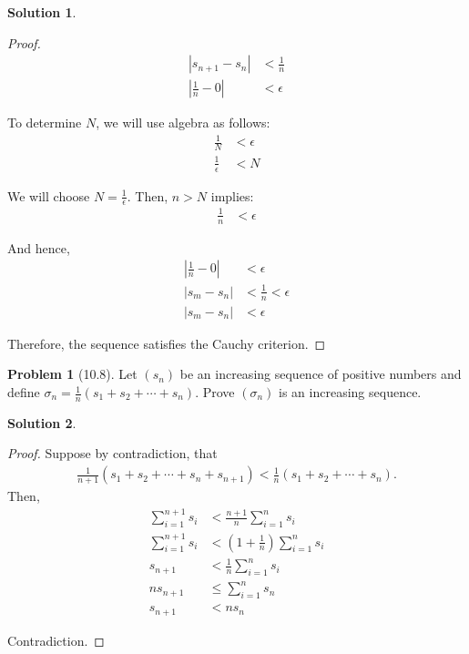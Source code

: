 \documentclass[12pt]{article}
\theoremstyle{definition} %
\newtheorem{solution}{Solution}
\newtheorem{problem}{Problem}
\theoremstyle{plain} %
\begin{document}
\begin{solution}
\begin{enumerate}
\begin{proof}
            \begin{align}
                |s_{n+1} - s_n| &< \frac{1}{n} \tag{40} \\
                \left| \frac{1}{n} - 0 \right| &< \epsilon \tag{41}
            \end{align}
        
            To determine $N$, we will use algebra as follows:
            \begin{align}
                \frac{1}{N} &< \epsilon \tag{42} \\
                \frac{1}{\epsilon} &< N \tag{43}
            \end{align}
        
            We will choose $N = \frac{1}{\epsilon}$. Then, $n > N$ implies:
            \begin{align}
                \frac{1}{n} &< \epsilon \tag{44}
            \end{align}
        
            And hence,
            \begin{align}
                \left| \frac{1}{n} - 0 \right| &< \epsilon \tag{45} \\
                |s_m - s_n| &< \frac{1}{n} < \epsilon \tag{46} \\
                |s_m - s_n| &< \epsilon \tag{47}
            \end{align}
        
            Therefore, the sequence satisfies the Cauchy criterion. 
        \end{proof}
    \end{enumerate}
\end{solution}

\begin{problem}[10.8]
    Let $(s_n)$ be an increasing sequence of positive numbers and define $\sigma_n = \frac{1}{n} (s_1 + s_2 + \cdots + s_n)$. Prove $(\sigma_n)$ is an increasing sequence.
\end{problem}

\begin{solution}
    \begin{proof}
        Suppose by contradiction, that 
        \begin{align}
        \frac{1}{n+1}(s_1 + s_2 + \cdots + s_n + s_{n+1}) < \frac{1}{n}(s_1 + s_2 + \cdots + s_n).
        \end{align}
        Then,
        \begin{align}
            \sum_{i=1}^{n+1} s_i &< \frac{n+1}{n} \sum_{i=1}^n s_i \tag{48} \\
            \sum_{i=1}^{n+1} s_i &< \left( 1 + \frac{1}{n} \right) \sum_{i=1}^n s_i \tag{49} \\
            s_{n+1} &< \frac{1}{n} \sum_{i=1}^n s_i \tag{50} \\
            ns_{n+1} &\leq \sum_{i=1}^n s_n \tag{51} \\
            s_{n+1} &< ns_n \tag{52}
        \end{align}
    
        Contradiction.
    \end{proof}
\end{solution}
\end{document}
